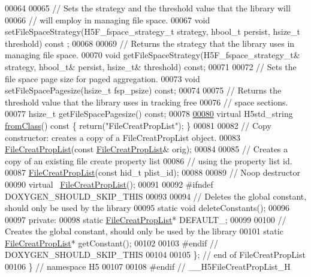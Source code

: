\begin{DoxyCode}
00064 
00065         \textcolor{comment}{// Sets the strategy and the threshold value that the library will}
00066         \textcolor{comment}{// will employ in managing file space.}
00067         \textcolor{keywordtype}{void} setFileSpaceStrategy(H5F\_fspace\_strategy\_t strategy, hbool\_t persist, hsize\_t threshold) \textcolor{keyword}{const}
      ;
00068 
00069         \textcolor{comment}{// Returns the strategy that the library uses in managing file space.}
00070         \textcolor{keywordtype}{void} getFileSpaceStrategy(H5F\_fspace\_strategy\_t& strategy, hbool\_t& persist, hsize\_t& threshold) \textcolor{keyword}{
      const};
00071 
00072         \textcolor{comment}{// Sets the file space page size for paged aggregation.}
00073         \textcolor{keywordtype}{void} setFileSpacePagesize(hsize\_t fsp\_psize) \textcolor{keyword}{const};
00074 
00075         \textcolor{comment}{// Returns the threshold value that the library uses in tracking free}
00076         \textcolor{comment}{// space sections.}
00077         hsize\_t getFileSpacePagesize() \textcolor{keyword}{const};
00078 
\hyperlink{class_h5_1_1_file_creat_prop_list_a5ae21c5253e8405e8bf0e58ac203b41d}{00080}         \textcolor{keyword}{virtual} H5std\_string \hyperlink{class_h5_1_1_file_creat_prop_list_a5ae21c5253e8405e8bf0e58ac203b41d}{fromClass}()\textcolor{keyword}{ const }\{ \textcolor{keywordflow}{return}(\textcolor{stringliteral}{"FileCreatPropList"}); \}
00081 
00082         \textcolor{comment}{// Copy constructor: creates a copy of a FileCreatPropList object.}
00083         \hyperlink{class_h5_1_1_file_creat_prop_list}{FileCreatPropList}(\textcolor{keyword}{const} \hyperlink{class_h5_1_1_file_creat_prop_list}{FileCreatPropList}& orig);
00084 
00085         \textcolor{comment}{// Creates a copy of an existing file create property list}
00086         \textcolor{comment}{// using the property list id.}
00087         \hyperlink{class_h5_1_1_file_creat_prop_list}{FileCreatPropList}(\textcolor{keyword}{const} hid\_t plist\_id);
00088 
00089         \textcolor{comment}{// Noop destructor}
00090         \textcolor{keyword}{virtual} ~\hyperlink{class_h5_1_1_file_creat_prop_list}{FileCreatPropList}();
00091 
00092 \textcolor{preprocessor}{#ifndef DOXYGEN\_SHOULD\_SKIP\_THIS}
00093 
00094         \textcolor{comment}{// Deletes the global constant, should only be used by the library}
00095         \textcolor{keyword}{static} \textcolor{keywordtype}{void} deleteConstants();
00096 
00097     \textcolor{keyword}{private}:
00098         \textcolor{keyword}{static} \hyperlink{class_h5_1_1_file_creat_prop_list}{FileCreatPropList}* DEFAULT\_;
00099 
00100         \textcolor{comment}{// Creates the global constant, should only be used by the library}
00101         \textcolor{keyword}{static} \hyperlink{class_h5_1_1_file_creat_prop_list}{FileCreatPropList}* getConstant();
00102 
00103 \textcolor{preprocessor}{#endif // DOXYGEN\_SHOULD\_SKIP\_THIS}
00104 
00105 \}; \textcolor{comment}{// end of FileCreatPropList}
00106 \} \textcolor{comment}{// namespace H5}
00107 
00108 \textcolor{preprocessor}{#endif // \_\_H5FileCreatPropList\_H}
\end{DoxyCode}
